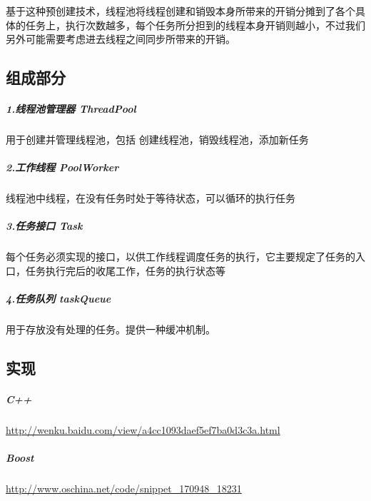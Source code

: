 \documentclass[UTF8,a4paper,8pt]{ctexbook}
\begin{document}
		基于这种预创建技术，线程池将线程创建和销毁本身所带来的开销分摊到了各个具体的任务上，执行次数越多，每个任务所分担到的线程本身开销则越小，不过我们另外可能需要考虑进去线程之间同步所带来的开销。
		\subsection{组成部分}
			\subparagraph{1.线程池管理器 ThreadPool}用于创建并管理线程池，包括 创建线程池，销毁线程池，添加新任务
			
			\subparagraph{2.工作线程 PoolWorker}线程池中线程，在没有任务时处于等待状态，可以循环的执行任务
			
			\subparagraph{3.任务接口 Task}每个任务必须实现的接口，以供工作线程调度任务的执行，它主要规定了任务的入口，任务执行完后的收尾工作，任务的执行状态等
			
			\subparagraph{4.任务队列 taskQueue}用于存放没有处理的任务。提供一种缓冲机制。
		
		\subsection{实现}
			\subparagraph{C++}\url{http://wenku.baidu.com/view/a4cc1093daef5ef7ba0d3c3a.html}
			
			\subparagraph{Boost}\url{http://www.oschina.net/code/snippet_170948_18231}
		
		
\end{document}

